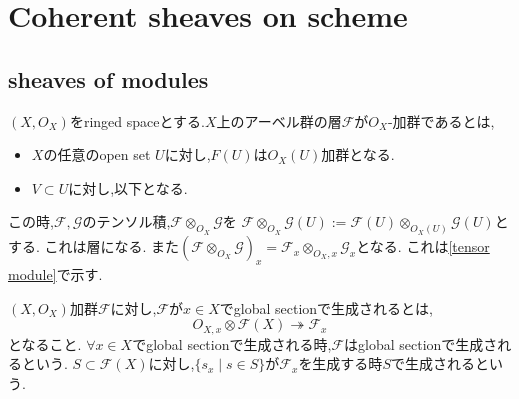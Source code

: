 \section{Coherent sheaves on scheme}
\subsection{sheaves of modules}

\begin{screen}
\begin{dfn}
 $(X, O_X)$をringed spaceとする.$X$上のアーベル群の層$\mathcal{F}$が$O_X$-加群であるとは,
 \begin{itemize}
   \item $X$の任意のopen set $U$に対し,$F(U)$は$O_X(U)$加群となる.
   \item $V \subset U$に対し,以下となる.

\end{itemize}
\end{dfn}
\end{screen}


この時,$\mathcal{F},\mathcal{G}$のテンソル積,$\mathcal{F} \otimes_{O_X} \mathcal{G}$を
$\mathcal{F} \otimes_{O_X} \mathcal{G}(U) := \mathcal{F}(U) \otimes_{O_X(U)} \mathcal{G}(U)$とする.
これは層になる.
また$(\mathcal{F} \otimes_{O_X} \mathcal{G})_x = \mathcal{F}_x \otimes_{O_X, x} \mathcal{G}_x$となる.
これは\ref{tensor module}で示す.


\begin{screen}
\begin{dfn}
$(X, O_X)$加群$\mathcal{F}$に対し,$\mathcal{F}$が$x \in X$でglobal sectionで生成されるとは,
\begin{equation*}
  O_{X,x} \otimes \mathcal{F}(X) \twoheadrightarrow \mathcal{F}_x
\end{equation*}
となること.
$\forall x \in X$でglobal sectionで生成される時,$\mathcal{F}$はglobal sectionで生成されるという.
$S \subset \mathcal{F}(X)$に対し,$\{s_x \mid s \in S\}$が$\mathcal{F}_x$を生成する時$S$で生成されるという.
\end{dfn}
\end{screen}

